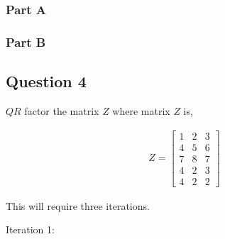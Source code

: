 \subsubsection{Part A}
\subsubsection{Part B}

\newpage
\subsection{Question 4}

\(QR\) factor the matrix \(Z\) where matrix \(Z\) is,

\begin{eqnarray}
  Z = 
  \begin{bmatrix}
    1 & 2 & 3 \\
    4 & 5 & 6 \\
    7 & 8 & 7 \\
    4 & 2 & 3 \\
    4 & 2 & 2
  \end{bmatrix}
\end{eqnarray}
  
This will require three iterations.

Iteration 1:

